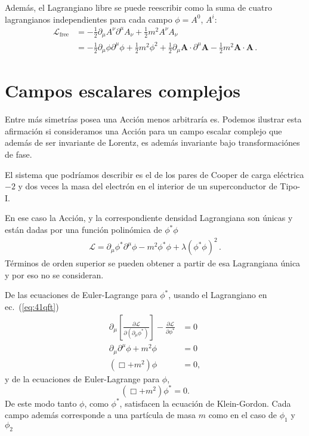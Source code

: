 \begin{frame}
Además, el Lagrangiano libre se puede reescribir como la suma de cuatro lagrangianos independientes para cada campo $\phi=A^0$, $A^i$:
\begin{align}
  \mathcal{L}_{\text{free}}&=-\frac{1}{2}\partial_\mu A^\nu\partial^\mu A_\nu+\frac{1}{2} m^2A^\nu A_\nu\nonumber\\
  &=-\frac{1}{2}\partial_\mu \phi\partial^\mu \phi+\frac{1}{2} m^2\phi^2
   +\frac{1}{2}\partial_\mu \boldsymbol{A}\cdot \partial^\mu \boldsymbol{A}-\frac{1}{2} m^2\boldsymbol{A}\cdot \boldsymbol{A}\,.
\end{align}

\end{frame}





\section{Campos escalares complejos}
Entre más simetrías posea una Acción menos arbitraría es. Podemos
ilustrar esta afirmación si consideramos una Acción para un campo escalar
complejo que además de ser invariante de Lorentz, es además invariante
bajo transformaciónes de fase.

El sistema que podríamos describir es el de los pares de Cooper de carga eléctrica $-2$ y dos veces la masa del electrón en el interior de un superconductor de Tipo-I.

\begin{frame}


En ese caso la Acción, y la correspondiente densidad Lagrangiana son
únicas y están dadas por una función polinómica de $\phi^{*}\phi$
\begin{align}
  \mathcal{L}=\partial_{\mu}\phi^{*} \partial^{\mu}\phi-m^2\phi^{*}\phi+\lambda \left(\phi^{*}\phi \right)^2\,.
\end{align}
Términos de orden superior se pueden obtener a partir de esa
Lagrangiana única y por eso no se consideran. 
\end{frame}

De las ecuaciones de Euler-Lagrange para $\phi^*$, usando el Lagrangiano en ec.~(\ref{eq:41qft})
\begin{align}
  \partial_\mu\left[
      \frac{\partial\mathcal{L}}{\partial(\partial_\mu\phi^*)}\right]-\frac{\partial\mathcal{L}}{\partial\phi^*}&=0\nonumber\\
    \partial_\mu\partial^\mu\phi+m^2\phi&=0\nonumber\\
    \label{eq:43qft}
    (\Box+m^2)\phi&=0,
\end{align}
y de la ecuaciones de Euler-Lagrange para $\phi$,
\begin{equation}
  \label{eq:44qft}
    (\Box+m^2)\phi^*=0.
\end{equation}
De este modo tanto $\phi$, como $\phi^*$, satisfacen la ecuación de Klein-Gordon. Cada campo además corresponde a una partícula de masa $m$ como en el caso de $\phi_1$ y $\phi_2$

